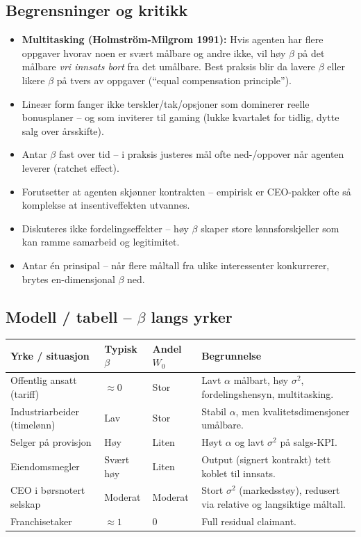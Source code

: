 \subsection*{Begrensninger og kritikk}
\begin{itemize}\setlength{\itemsep}{1pt}
\item \textbf{Multitasking (Holmström-Milgrom 1991):} Hvis agenten har flere oppgaver hvorav noen er svært målbare og andre ikke, vil høy $\beta$ på det målbare \emph{vri innsats bort} fra det umålbare. Best praksis blir da lavere $\beta$ eller likere $\beta$ på tvers av oppgaver (``equal compensation principle'').
\item Lineær form fanger ikke terskler/tak/opsjoner som dominerer reelle bonusplaner -- og som inviterer til gaming (lukke kvartalet for tidlig, dytte salg over årsskifte).
\item Antar $\beta$ fast over tid -- i praksis justeres mål ofte ned-/oppover når agenten leverer (ratchet effect).
\item Forutsetter at agenten skjønner kontrakten -- empirisk er CEO-pakker ofte så komplekse at insentiveffekten utvannes.
\item Diskuteres ikke fordelingseffekter -- høy $\beta$ skaper store lønnsforskjeller som kan ramme samarbeid og legitimitet.
\item Antar én prinsipal -- når flere måltall fra ulike interessenter konkurrerer, brytes en-dimensjonal $\beta$ ned.
\end{itemize}

\subsection*{Modell / tabell -- $\beta$ langs yrker}

\begin{center}
\renewcommand{\arraystretch}{1.15}
\begin{tabular}{@{}p{4.4cm}p{1.4cm}p{2.2cm}p{6.2cm}@{}}
\toprule
\textbf{Yrke / situasjon} & \textbf{Typisk $\beta$} & \textbf{Andel $W_0$} & \textbf{Begrunnelse} \\
\midrule
Offentlig ansatt (tariff) & $\approx 0$ & Stor & Lavt $\alpha$ målbart, høy $\sigma^{2}$, fordelingshensyn, multitasking. \\
Industriarbeider (timelønn) & Lav & Stor & Stabil $\alpha$, men kvalitetsdimensjoner umålbare. \\
Selger på provisjon & Høy & Liten & Høyt $\alpha$ og lavt $\sigma^{2}$ på salgs-KPI. \\
Eiendomsmegler & Svært høy & Liten & Output (signert kontrakt) tett koblet til innsats. \\
CEO i børsnotert selskap & Moderat & Moderat & Stort $\sigma^{2}$ (markedsstøy), redusert via relative og langsiktige måltall. \\
Franchisetaker & $\approx 1$ & 0 & Full residual claimant. \\
\bottomrule
\end{tabular}
\end{center}

